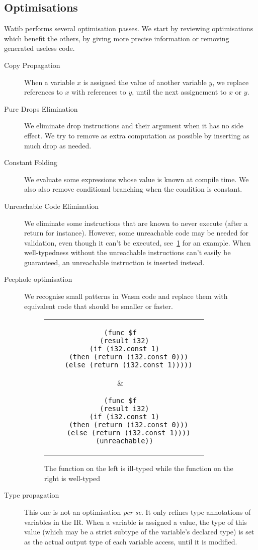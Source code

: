 \documentclass[10pt]{article}
\begin{document}
\subsection{Optimisations}
Watib performs several optimisation passes. We start by reviewing optimisations
which benefit the others, by giving more precise information or removing
generated useless code.
\begin{description}
  \item[Copy Propagation] When a variable $x$ is assigned the value of another
    variable $y$, we replace references to $x$ with references to $y$, until the
    next assignement to $x$ or $y$.
  \item[Pure Drops Elimination] We eliminate \textsf{drop} instructions and
    their argument when it has no side effect. We try to remove as extra
    computation as possible by inserting as much \textsf{drop} as needed.
  \item[Constant Folding] We evaluate some expressions whose value is known at
    compile time. We also also remove conditional branching when the condition
    is constant.
  \item[Unreachable Code Elimination] We eliminate some instructions that are
    known to never execute (after a \textsf{return} for instance). However, some
    unreachable code may be needed for validation, even though it can't be
    executed, see~\ref{unreachable} for an example. When well-typedness without
    the unreachable instructions can't easily be guaranteed, an
    \textsf{unreachable} instruction is inserted instead.
  \item[Peephole optimisation] We recognise small patterns in Wasm code and
    replace them with equivalent code that should be smaller or faster.
\begin{figure}[h]
\centering
\begin{tabular}{c c}
\begin{minipage}{2.8in}
\begin{verbatim}
(func $f
  (result i32)
  (if (i32.const 1)
    (then (return (i32.const 0)))
    (else (return (i32.const 1)))))
\end{verbatim}
\end{minipage}
&\begin{minipage}{2.8in}
\begin{verbatim}
(func $f
  (result i32)
  (if (i32.const 1)
    (then (return (i32.const 0)))
    (else (return (i32.const 1))))
  (unreachable))
\end{verbatim}
\end{minipage}
\end{tabular}
\caption{The function on the left is ill-typed while the function on the right
  is well-typed}\label{unreachable}
\end{figure}
  \item[Type propagation] This one is not an optimisation \emph{per se}. It only
    refines type annotations of variables in the IR. When a variable is assigned
    a value, the type of this value (which may be a strict subtype of the
    variable's declared type) is set as the actual output type of each variable
    access, until it is modified.
\end{description}
\end{document}
